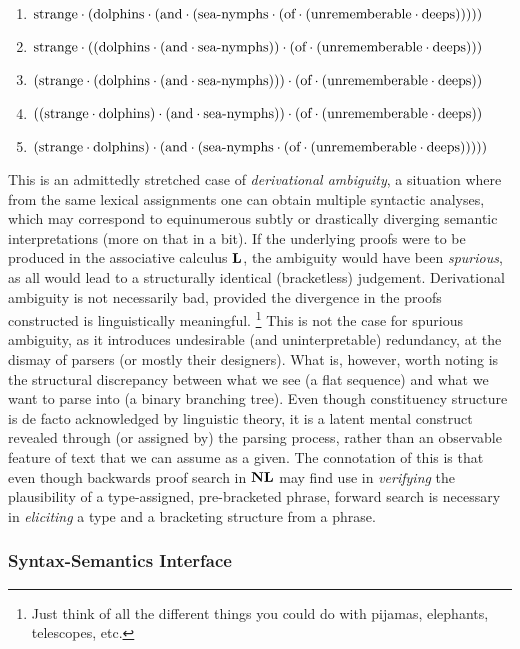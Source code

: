 {\smaller
\begin{enumerate}
\item $\text{strange}\cdot(\text{dolphins}\cdot(\text{and}\cdot(\text{sea-nymphs}\cdot(\text{of}\cdot(\text{unrememberable}\cdot\text{deeps})))))$
\item $\text{strange}\cdot((\text{dolphins}\cdot(\text{and}\cdot\text{sea-nymphs}))\cdot(\text{of}\cdot(\text{unrememberable}\cdot\text{deeps})))$
\item $(\text{strange}\cdot(\text{dolphins}\cdot(\text{and}\cdot\text{sea-nymphs})))\cdot(\text{of}\cdot(\text{unrememberable}\cdot\text{deeps}))$
\item $((\text{strange}\cdot\text{dolphins})\cdot(\text{and}\cdot\text{sea-nymphs}))\cdot(\text{of}\cdot(\text{unrememberable}\cdot\text{deeps}))$
\item $(\text{strange}\cdot\text{dolphins})\cdot(\text{and}\cdot(\text{sea-nymphs}\cdot(\text{of}\cdot(\text{unrememberable}\cdot\text{deeps})))))$
\end{enumerate}
}
This is an admittedly stretched case of \textit{derivational ambiguity}, a situation where from the same lexical assignments one can obtain multiple syntactic analyses, which may correspond to equinumerous subtly or drastically diverging semantic interpretations (more on that in a bit).
If the underlying proofs were to be produced in the associative calculus $\textbf{L}$, the ambiguity would have been \textit{spurious}, as all would lead to a structurally identical (bracketless) judgement.
Derivational ambiguity is not necessarily bad, provided the divergence in the proofs constructed is linguistically meaningful.%
\footnote{Just think of all the different things you could do with pijamas, elephants, telescopes, etc.}
This is not the case for spurious ambiguity, as it introduces undesirable (and uninterpretable) redundancy, at the dismay of parsers (or mostly their designers).
What is, however, worth noting is the structural discrepancy between what we see (a flat sequence) and what we want to parse into (a binary branching tree).
Even though constituency structure is de facto acknowledged by linguistic theory, it is a latent mental construct revealed through (or assigned by) the parsing process, rather than an observable feature of text that we can assume as a given.
The connotation of this is that even though backwards proof search in $\textbf{NL}$ may find use in \textit{verifying} the plausibility of a type-assigned, pre-bracketed phrase, forward search is necessary in \textit{eliciting} a type and a bracketing structure from a phrase. 


\subsubsection{Syntax-Semantics Interface}

